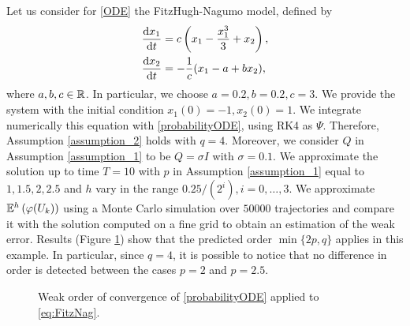 Let us consider for \eqref{ODE} the FitzHugh-Nagumo model, defined by
\begin{equation}\label{eq:FitzNag}
\begin{aligned}
	\dv{x_1}{t} &= c\left(x_1 - \frac{x_1^3}{3} + x_2\right), \\
	\dv{x_2}{t} &= -\frac{1}{c}(x_1 - a + bx_2),
\end{aligned}
\end{equation}
where $a, b, c \in \mathbb{R}$. In particular, we choose $a = 0.2, b = 0.2, c = 3$. We provide the system with the initial condition $x_1(0) = -1, x_2(0) = 1$. We integrate numerically this equation with \eqref{probabilityODE}, using RK4 as $\Psi$. Therefore, Assumption \ref{assumption_2} holds with $q = 4$. Moreover, we consider $Q$ in Assumption \ref{assumption_1} to be $Q = \sigma I$ with $\sigma = 0.1$. We approximate the solution up to time $T = 10$ with $p$ in Assumption \ref{assumption_1} equal to $1, 1.5, 2, 2.5$  and $h$ vary in the range $0.25 / (2^i), i = 0, \ldots, 3$. We approximate $\mathbb{E}^h\left(\varphi(U_k)\right)$ using a Monte Carlo simulation over $50000$ trajectories and compare it with the solution computed on a fine grid to obtain an estimation of the weak error. Results (Figure \ref{fig:weakorder}) show that the predicted order $\min\{2p, q\}$ applies in this example. In particular, since $q = 4$, it is possible to notice that no difference in order is detected between the cases $p = 2$ and $p = 2.5$. 

\begin{figure}
\centering
\resizebox{0.6\linewidth}{!}{}
\caption{Weak order of convergence of \eqref{probabilityODE} applied to \eqref{eq:FitzNag}.}
\label{fig:weakorder}
\end{figure}